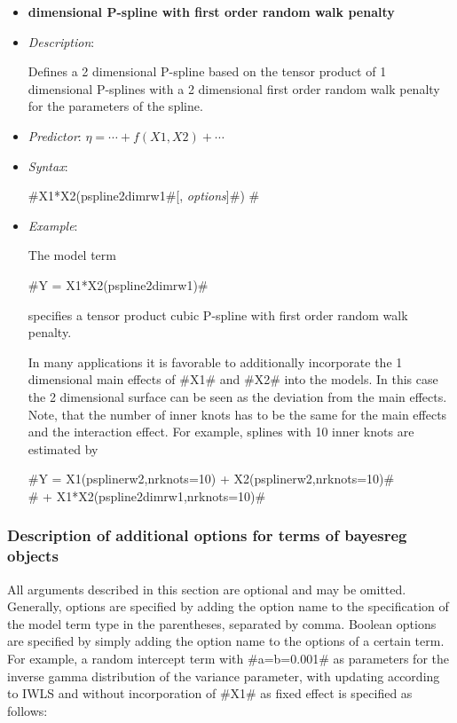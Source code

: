 \begin{itemize}
\item[] {\bf{} dimensional P-spline with first order
random walk penalty}

\item[] {\em Description}:

Defines a 2 dimensional P-spline based on the tensor product of 1
dimensional P-splines with a 2 dimensional first order random walk
penalty for the parameters of the spline.
\item[] {\em Predictor}: $\eta= \cdots + f(X1,X2) + \cdots$
\item[] {\em Syntax}:

#X1*X2(pspline2dimrw1#[, {\em options}]#) #
\item[] {\em Example}:

The model term

#Y = X1*X2(pspline2dimrw1)#

specifies a tensor product cubic P-spline with first order random
walk penalty.

In many applications it is favorable to additionally incorporate
the 1 dimensional main effects of #X1# and #X2# into the models.
In this case the 2 dimensional surface can be seen as the
deviation from the main effects. Note, that the number of inner
knots has to be the same for the main effects and the interaction
effect. For example, splines with 10 inner knots are estimated by


 #Y = X1(psplinerw2,nrknots=10) + X2(psplinerw2,nrknots=10)#\\
 #    + X1*X2(pspline2dimrw1,nrknots=10)#
\end{itemize}



\subsubsection{Description of additional options for terms of bayesreg objects}
\label{localoptions}

All arguments described in this section are optional and may be
omitted. Generally, options are specified by adding the option
name to the specification of the model term type in the
parentheses, separated by comma. Boolean options are specified by
simply adding the option name to the options of a certain term.
For example, a random intercept term with #a=b=0.001# as
parameters for the inverse gamma distribution of the variance
parameter, with updating according to IWLS and without
incorporation of #X1# as fixed effect is specified as follows:

